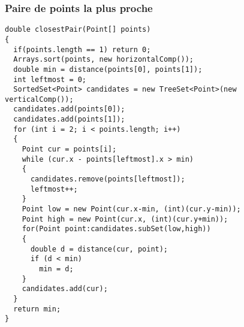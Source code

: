 \subsubsection{Paire de points la plus proche}
\begin{lstlisting}
double closestPair(Point[] points)
{
  if(points.length == 1) return 0;
  Arrays.sort(points, new horizontalComp());
  double min = distance(points[0], points[1]);
  int leftmost = 0;
  SortedSet<Point> candidates = new TreeSet<Point>(new verticalComp());  
  candidates.add(points[0]);
  candidates.add(points[1]);
  for (int i = 2; i < points.length; i++)
  {
    Point cur = points[i];
    while (cur.x - points[leftmost].x > min)
    {
      candidates.remove(points[leftmost]);
      leftmost++;
    }
    Point low = new Point(cur.x-min, (int)(cur.y-min));
    Point high = new Point(cur.x, (int)(cur.y+min));
    for(Point point:candidates.subSet(low,high))
    {
      double d = distance(cur, point);
      if (d < min)
        min = d;
    }
    candidates.add(cur);
  }
  return min;
}
\end{lstlisting}
